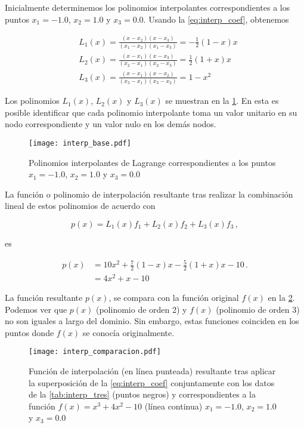 Inicialmente determinemos los polinomios interpolantes correspondientes a 
los puntos $x_1 = -1.0$, $x_2 =  1.0$ y $x_3 = 0.0$. Usando la 
\cref{eq:interp_coef}, obtenemos

\begin{align*}
& L_1(x) = \frac{(x - x_2)(x - x_3)}{(x_1 - x_2)(x_1 - x_3)} = -\frac{1}{2}(1 
- x)x\\
& L_2(x) = \frac{(x - x_1)(x - x_3)}{(x_2 - x_1)(x_2 - x_3)} = \frac{1}{2}(1 
+ x)x\\
& L_3(x) = \frac{(x - x_1)(x - x_2)}{(x_3 - x_1)(x_3 - x_2)} = 1 - x^2
\end{align*}

Los polinomios $L_1(x)$, $L_2(x)$ y $L_3(x)$ se muestran en la 
\cref{fig:interp_base}. En esta es posible identificar que cada polinomio 
interpolante toma un valor unitario en su nodo correspondiente y un valor nulo 
en los demás nodos.
\begin{figure}[H]
  \centering
  \texttt{[image: interp\_base.pdf]}
  \caption{Polinomios interpolantes de Lagrange correspondientes a los puntos $x_1 =  -1.0$, $x_2 = 1.0$ y $x_3 = 0.0$}
  \label{fig:interp_base}
\end{figure}

La función o polinomio de interpolación resultante tras realizar la combinación lineal de estos polinomios de acuerdo con

\[p(x) = L_1(x) f_1 + L_2(x) f_2 + L_3(x) f_3\, ,\]

es

\begin{align*}
p(x) &= 10 x^2 + \frac{7}{2}(1 - x)x - \frac{5}{2}(1 + x)x - 10\, .\\
     &= 4x^2 + x - 10
\end{align*}

La función resultante $p(x)$, se compara con la función original $f(x)$ en la \cref{fig:interp_comparacion}. Podemos ver que $p(x)$ (polinomio de orden 2) y $f(x)$ (polinomio de orden 3) no son iguales a largo del dominio. Sin embargo, estas funciones coinciden en los puntos donde $f(x)$ se conocía originalmente.

\begin{figure}[H]
  \centering
  \texttt{[image: interp\_comparacion.pdf]}
  \caption{Función de interpolación (en línea punteada) resultante tras aplicar 
  la superposición de la \cref{eq:interp_coef} conjuntamente con los datos de 
  la \cref{tab:interp_tres} (puntos negros) y correspondientes a la función 
  $f(x) = {x^3} + 4{x^2} - 10$ (línea continua) ${x_1} =  - 1.0$, ${x_2} =  
  1.0$ y ${x_3} = 0.0$}
  \label{fig:interp_comparacion}
\end{figure}

